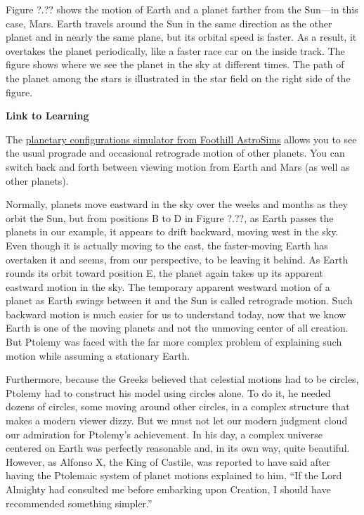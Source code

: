 \documentclass[../../main-astronomy.tex]{subfiles}
\begin{document}
\vspace{1em}

Figure ?.?? shows the motion of Earth and a planet farther from the Sun---in this case, Mars. Earth travels around the Sun in the same direction as the other planet and in nearly the same plane, but its orbital speed is faster. As a result, it overtakes the planet periodically, like a faster race car on the inside track. The figure shows where we see the planet in the sky at different times. The path of the planet among the stars is illustrated in the star field on the right side of the figure.


\vspace{1em}

\begin{mdframed}[backgroundcolor=black!10]
    \textbf{Link to Learning}

    \vspace{1ex}

    The \href{https://openstax.org/l/30planetconfig}{planetary configurations simulator from Foothill AstroSims} allows you to see the usual prograde and occasional retrograde motion of other planets. You can switch back and forth between viewing motion from Earth and Mars (as well as other planets).
\end{mdframed}

\vspace{1em}

Normally, planets move eastward in the sky over the weeks and months as they orbit the Sun, but from positions B to D in Figure ?.??, as Earth passes the planets in our example, it appears to drift backward, moving west in the sky. Even though it is actually moving to the east, the faster-moving Earth has overtaken it and seems, from our perspective, to be leaving it behind. As Earth rounds its orbit toward position E, the planet again takes up its apparent eastward motion in the sky. The temporary apparent westward motion of a planet as Earth swings between it and the Sun is called \gls{retrograde motion}. Such backward motion is much easier for us to understand today, now that we know Earth is one of the moving planets and not the unmoving center of all creation. But Ptolemy was faced with the far more complex problem of explaining such motion while assuming a stationary Earth.

\vspace{1em}

Furthermore, because the Greeks believed that celestial motions had to be circles, Ptolemy had to construct his model using circles alone. To do it, he needed dozens of circles, some moving around other circles, in a complex structure that makes a modern viewer dizzy. But we must not let our modern judgment cloud our admiration for Ptolemy's achievement. In his day, a complex universe centered on Earth was perfectly reasonable and, in its own way, quite beautiful. However, as Alfonso X, the King of Castile, was reported to have said after having the Ptolemaic system of planet motions explained to him, ``If the Lord Almighty had consulted me before embarking upon Creation, I should have recommended something simpler.''
\end{document}
